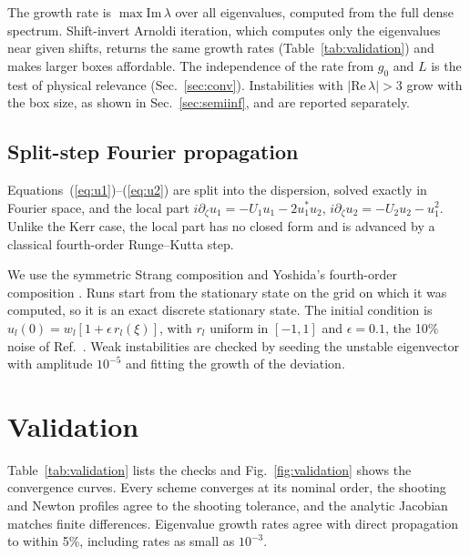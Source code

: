 \documentclass[pra,twocolumn,superscriptaddress,longbibliography]{revtex4-2}
\newcommand{\Img}{\mathrm{Im}\,}
\newcommand{\Rea}{\mathrm{Re}\,}
\begin{document}
The growth rate is $\max\Img\lambda$ over all eigenvalues, computed from the full dense
spectrum. Shift-invert Arnoldi iteration, which computes only the eigenvalues near given shifts,
returns the same growth rates (Table~\ref{tab:validation}) and makes larger boxes affordable.
The independence of the rate from $g_0$ and $L$ is the test of physical relevance
(Sec.~\ref{sec:conv}). Instabilities with $|\Rea\lambda|>3$ grow
with the box size, as shown in Sec.~\ref{sec:semiinf}, and are reported separately.

\subsection{Split-step Fourier propagation}
Equations~(\ref{eq:u1})--(\ref{eq:u2}) are split into the dispersion, solved exactly in Fourier
space, and the local part $i\partial_\zeta u_1 = -U_1u_1-2u_1^{*}u_2$,
$i\partial_\zeta u_2 = -U_2u_2-u_1^2$. Unlike the Kerr case, the local part has no closed form and
is advanced by a classical fourth-order Runge--Kutta step.

We use the symmetric Strang composition \cite{Strang1968,Weideman1986} and Yoshida's
fourth-order composition \cite{Yoshida1990}. Runs start from the stationary state on the grid on
which it was computed, so it is an exact discrete stationary state. The initial condition is
$u_l(0) = w_l[1+\epsilon\,r_l(\xi)]$, with $r_l$ uniform in $[-1,1]$ and $\epsilon=0.1$, the 10\%
noise of Ref.~\cite{MKM2013}. Weak instabilities are checked by seeding the unstable eigenvector
with amplitude $10^{-5}$ and fitting the growth of the deviation.

\section{Validation}\label{sec:validation}
Table~\ref{tab:validation} lists the checks and Fig.~\ref{fig:validation} shows the convergence
curves. Every scheme converges at its nominal order, the shooting and Newton profiles agree to the
shooting tolerance, and the analytic Jacobian matches finite differences. Eigenvalue growth rates
agree with direct propagation to within 5\%, including rates as small as $10^{-3}$.

\begin{table}[t]
\caption{\label{tab:validation}Checks of each building block against a known answer
(results/validation.json, results/weak.json). Weak growth rates: $\Img\lambda$ vs growth of a
seeded perturbation in split-step propagation.}
\footnotesize

\end{table}
\end{document}
